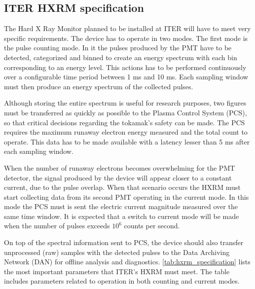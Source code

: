 \subsection{ITER HXRM specification}

The Hard X Ray Monitor planned to be installed at ITER will 
have to meet very specific requirements. The device 
has to operate in two modes. The first mode is the pulse 
counting mode. In it the pulses produced by the PMT have to be
detected, categorized and binned to create an energy spectrum
with each bin corresponding to an energy level. This actions has to be 
performed continuously over a configurable time period between
1 ms and 10 ms. Each sampling window must then produce an 
energy spectrum of the collected pulses. 
\cite{iter_hxrm_ddd}


Although storing the entire spectrum
is useful for research purposes, two figures must be transferred 
as quickly as possible to the Plasma Control System (PCS), so that
critical decisions regarding the tokamak's safety can be made.
The PCS requires the maximum runaway electron energy measured
and the total count to operate. This data has to be made available
with a latency lesser than 5 ms after each sampling window.
\cite{iter_hxrm_ddd}


When the number of runaway electrons becomes overwhelming for
the PMT detector, the signal produced by the device will 
appear closer to a constant current, due to the pulse overlap.
When that scenario occurs the HXRM must start collecting data from 
its second PMT operating in the current mode. In this mode the PCS 
must is sent the electric current magnitude measured over the 
same time window. It is expected that a switch to current mode
will be made when the number of pulses exceeds $10^6$ counts per second.


On top of the spectral information sent to PCS,
the device should also transfer unprocessed (raw) samples with the detected pulses
to the Data Archiving Network (DAN) for offline analysis and diagnostics.
\autoref{tab:hxrm_specification} lists the most important 
parameters that ITER's HXRM must meet. 
The table includes parameters related to operation 
in both counting and current modes.

